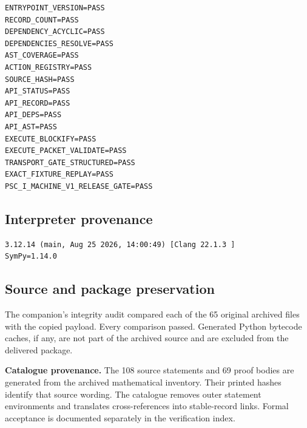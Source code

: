\documentclass[a4paper,11pt]{article}
\begin{document}
\begin{lstlisting}
ENTRYPOINT_VERSION=PASS
RECORD_COUNT=PASS
DEPENDENCY_ACYCLIC=PASS
DEPENDENCIES_RESOLVE=PASS
AST_COVERAGE=PASS
ACTION_REGISTRY=PASS
SOURCE_HASH=PASS
API_STATUS=PASS
API_RECORD=PASS
API_DEPS=PASS
API_AST=PASS
EXECUTE_BLOCKIFY=PASS
EXECUTE_PACKET_VALIDATE=PASS
TRANSPORT_GATE_STRUCTURED=PASS
EXACT_FIXTURE_REPLAY=PASS
PSC_I_MACHINE_V1_RELEASE_GATE=PASS

\end{lstlisting}
\subsection*{Interpreter provenance}

\begin{lstlisting}
3.12.14 (main, Aug 25 2026, 14:00:49) [Clang 22.1.3 ]
SymPy=1.14.0

\end{lstlisting}
\subsection*{Source and package preservation}
The companion's integrity audit compared each of the 65 original archived files with the copied payload. Every comparison passed. Generated Python bytecode caches, if any, are not part of the archived source and are excluded from the delivered package.

\textbf{Catalogue provenance.} The 108 source statements and 69 proof bodies are generated from the archived mathematical inventory. Their printed hashes identify that source wording. The catalogue removes outer statement environments and translates cross-references into stable-record links. Formal acceptance is documented separately in the verification index.
\end{document}
